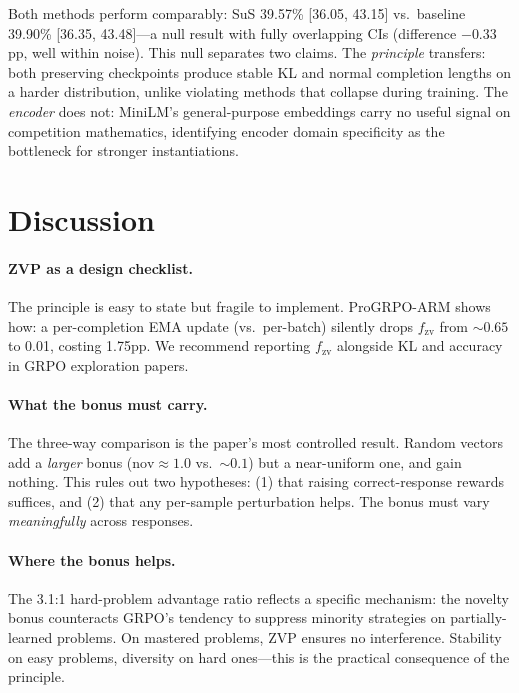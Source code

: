 \documentclass[10pt]{article}
\begin{document}
Both methods perform comparably: SuS 39.57\% [36.05, 43.15] vs.\ baseline 39.90\% [36.35, 43.48]---a null result with fully overlapping CIs (difference $-0.33$pp, well within noise). This null separates two claims. The \emph{principle} transfers: both preserving checkpoints produce stable KL and normal completion lengths on a harder distribution, unlike violating methods that collapse during training. The \emph{encoder} does not: MiniLM's general-purpose embeddings carry no useful signal on competition mathematics, identifying encoder domain specificity as the bottleneck for stronger instantiations.

\section{Discussion}
\label{sec:discussion}

\paragraph{ZVP as a design checklist.}
The principle is easy to state but fragile to implement. ProGRPO-ARM shows how: a per-completion EMA update (vs.\ per-batch) silently drops $f_{\text{zv}}$ from ${\sim}0.65$ to 0.01, costing 1.75pp. We recommend reporting $f_{\text{zv}}$ alongside KL and accuracy in GRPO exploration papers.

\paragraph{What the bonus must carry.}
The three-way comparison is the paper's most controlled result. Random vectors add a \emph{larger} bonus ($\text{nov} \approx 1.0$ vs.\ ${\sim}0.1$) but a near-uniform one, and gain nothing. This rules out two hypotheses: (1) that raising correct-response rewards suffices, and (2) that any per-sample perturbation helps. The bonus must vary \emph{meaningfully} across responses.

\paragraph{Where the bonus helps.}
The 3.1:1 hard-problem advantage ratio reflects a specific mechanism: the novelty bonus counteracts GRPO's tendency to suppress minority strategies on partially-learned problems. On mastered problems, ZVP ensures no interference. Stability on easy problems, diversity on hard ones---this is the practical consequence of the principle.
\end{document}

